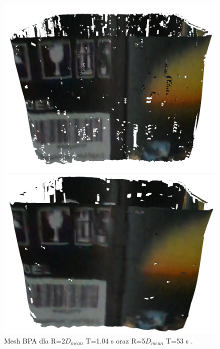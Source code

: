 \begin{figure}[H]
\centering
    \begin{minipage}[b]{0.45\linewidth}
        \includegraphics[scale=0.3]{bpaBox2x.PNG}
    \end{minipage}
\quad
    \begin{minipage}[b]{0.45\linewidth}
        \includegraphics[scale=0.3]{bpaBox5x.PNG}
    \end{minipage}
\caption{Mesh BPA dla R=2$D_{mean}$ T=1.04 s oraz R=5$D_{mean}$ T=53 s .}
\label{fig:boxComparison1}
\end{figure}

